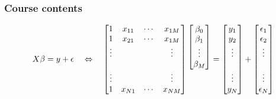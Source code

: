 \documentclass[13pt]{beamer}
\begin{document}
\begin{frame}\frametitle{Course contents}
\begin{center}
\scalebox{3}{\textcolor{gray}{Welcome}}
%
\scalebox{2}{\textsc{!}}

\begin{displaymath}
X\beta = y + \epsilon \quad \Leftrightarrow \quad
\begin{bmatrix}
1 & x_{11} &  \cdots & x_{1M} \\
1 & x_{21} &  \cdots & x_{1M} \\
\vdots &  &  & \vdots \\
\\
\vdots &  &  & \vdots \\
1 & x_{N1} & \cdots & x_{NM} \\
\end{bmatrix}
\raisebox{1.5em}{$\begin{bmatrix}
\beta_0 \\ \beta_1 \\ \vdots \\ \beta_M 
\end{bmatrix}$} = 
\begin{bmatrix}
y_1 \\ y_2 \\ \vdots \\ \\ \vdots \\ y_N 
\end{bmatrix} + 
\begin{bmatrix}
\epsilon_1 \\ \epsilon_2 \\ \vdots \\ \\ \vdots \\ \epsilon_N 
\end{bmatrix}
\end{displaymath}
\end{center}
\end{frame}
\end{document}
